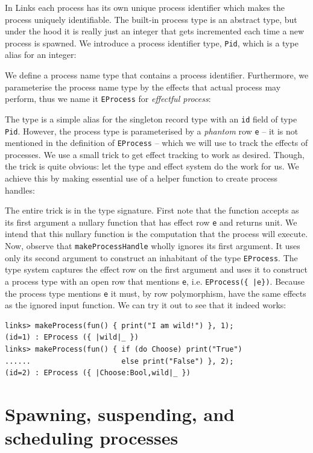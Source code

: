 \documentclass[12pt,mscres,cdtppar,twoside,openright,logo,rightchapter,normalheadings]{infthesis}
\newcommand{\snippet}[1]{}
\theoremstyle{definition}
\begin{document}
In Links each process has its own unique process identifier which
makes the process uniquely identifiable. The built-in process type is
an abstract type, but under the hood it is really just an integer that
gets incremented each time a new process is spawned. We introduce a
process identifier type, \lstinline$Pid$, which is a type alias for an
integer:
%
\snippet{pidInt.links}
%
We define a process name type that contains a process
identifier. Furthermore, we parameterise the process name type by the
effects that actual process may perform, thus we name it
\lstinline$EProcess$ for \emph{effectful process}:
%
\snippet{eprocess.links}
%
The type is a simple alias for the singleton record type with an
\lstinline$id$ field of type \lstinline$Pid$. However, the process
type is parameterised by a \emph{phantom} row \lstinline$e$ -- it is
not mentioned in the definition of \lstinline$EProcess$ -- which we
will use to track the effects of processes. We use a small trick to
get effect tracking to work as desired. Though, the trick is quite
obvious: let the type and effect system do the work for us. We achieve
this by making essential use of a helper function to create process
handles:
%
\snippet{makeProcess.links}
%
The entire trick is in the type signature. First note that the
function accepts as its first argument a nullary function that has
effect row \lstinline$e$ and returns unit. We intend that this nullary
function is the computation that the process will execute. Now,
observe that \lstinline$makeProcessHandle$ wholly ignores its first
argument. It uses only its second argument to construct an inhabitant
of the type \lstinline$EProcess$. The type system captures the effect
row on the first argument and uses it to construct a process type with
an open row that mentions \lstinline$e$, i.e.
\lstinline$EProcess({ |e})$. Because the process type mentions
\lstinline$e$ it must, by row polymorphism, have the same effects as
the ignored input function. We can try it out to see that it indeed
works:
%
\begin{lstlisting}
links> makeProcess(fun() { print("I am wild!") }, 1);
(id=1) : EProcess ({ |wild|_ })
links> makeProcess(fun() { if (do Choose) print("True") 
......                     else print("False") }, 2);
(id=2) : EProcess ({ |Choose:Bool,wild|_ })
\end{lstlisting}
%

\section{Spawning, suspending, and scheduling processes}
\label{sec:links-model-handlers-scheduler}
\end{document}

